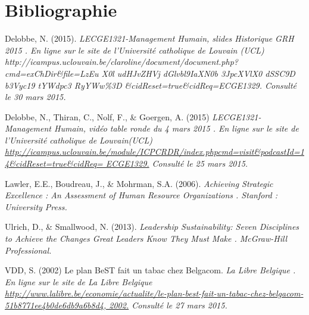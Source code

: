 \pagebreak
\section*{Bibliographie}

Delobbe, N. (2015). \it LECGE1321-Management Humain, slides Historique GRH 2015 \normalfont. En ligne sur le site de l’Université catholique de Louvain (UCL) http://icampus.uclouvain.be/claroline/document/document.php?cmd=exChDir\&file=LzEu X0l udHJvZHVj dGlvbl9IaXN0b 3JpcXVlX0 dSSC9D b3Vyc19 tYWdpc3 RyYWw\%3D \&cidReset=true\&cidReq=ECGE1329. Consulté le 30 mars 2015. \newline

Delobbe, N., Thiran, C., Nolf, F., \& Goergen, A. (2015) \it LECGE1321-Management Humain, vidéo table ronde du 4 mars 2015 \normalfont. En ligne sur le site de l’Université catholique de Louvain(UCL) \url{http://icampus.uclouvain.be/module/ICPCRDR/index.phpcmd=visit\&podcastId=14\&cidReset=true\&cidReq= ECGE1329.} Consulté le 25 mars 2015. \newline


Lawler, E.E., Boudreau, J., \& Mohrman, S.A. (2006). \it Achieving Strategic Excellence : An Assessment of Human Resource Organizations \normalfont. Stanford : University Press.\newline


Ulrich, D., \& Smallwood, N. (2013). \it Leadership Sustainability: Seven Disciplines to Achieve the Changes Great Leaders Know They Must Make \normalfont. McGraw-Hill Professional.\newline


VDD, S. (2002) Le plan BeST fait un tabac chez Belgacom. \it La Libre Belgique \normalfont. En ligne sur le site de La Libre Belgique \url{http://www.lalibre.be/economie/actualite/le-plan-best-fait-un-tabac-chez-belgacom-51b8771ee4b0de6db9a6b8d4, 2002.} Consulté le 27 mars 2015. 
